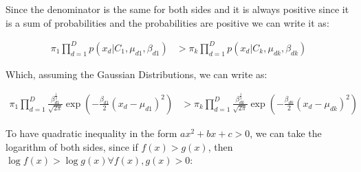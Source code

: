 \documentclass[12pt,a4paper,oneside]{paper}
\begin{document}
Since the denominator is the same for both sides and it is always positive since it is a sum of probabilities and the probabilities are positive we can write it as:

\begin{align*}
    \pi_1 \prod_{d=1}^{D} p(x_d | C_1, \mu_{d1}, \beta_{d1}) &> \pi_k \prod_{d=1}^{D} p(x_d | C_k, \mu_{dk}, \beta_{dk})
\end{align*}

Which, assuming the Gaussian Distributions, we can write as:

\begin{align*}
    \pi_1 \prod_{d=1}^{D} \frac{\beta_{d1}^{\frac{1}{2}}}{\sqrt{2\pi}} \exp\left(-\frac{\beta_{d1}}{2} (x_d - \mu_{d1})^2\right) &> \pi_k \prod_{d=1}^{D} \frac{\beta_{dk}^{\frac{1}{2}}}{\sqrt{2\pi}} \exp\left(-\frac{\beta_{dk}}{2} (x_d - \mu_{dk})^2\right)
\end{align*}

To have quadratic inequality in the form $ax^2 + bx + c > 0$, we can take the logarithm of both sides, since if $f(x) > g(x)$, then $\log f(x) > \log g(x) \forall f(x),g(x) > 0$:
\end{document}
